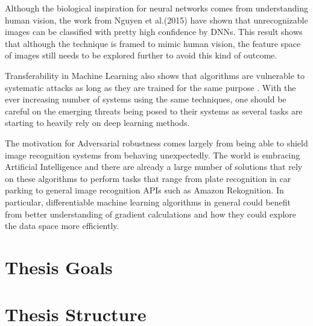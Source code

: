 Although the biological inspiration for neural networks comes from understanding human vision, the work from Nguyen et al.(2015) \cite{nguyen2015} have shown that unrecognizable images can be classified with pretty high confidence by DNNs. This result shows that although the technique is framed to mimic human vision, the feature space of images still needs to be explored further to avoid this kind of outcome.

Transferability in Machine Learning also shows that algorithms are vulnerable to systematic attacks as long as they are trained for the same purpose \cite{papernot2016transf}. With the ever increasing number of systems using the same techniques, one should be careful on the emerging threats being posed to their systems as several tasks are starting to heavily rely on deep learning methods.

The motivation for Adversarial robustness comes largely from being able to shield image recognition systems from behaving unexpectedly. The world is embracing Artificial Intelligence and there are already a large number of solutions that rely on these algorithms to perform tasks that range from plate recognition in car parking to general image recognition APIs such as Amazon Rekognition. In particular, differentiable machine learning algorithms in general could benefit from better understanding of gradient calculations and how they could explore the data space more efficiently.

\section{Thesis Goals}

\section{Thesis Structure}


